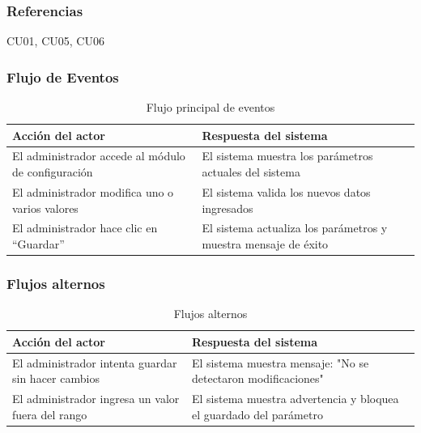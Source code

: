\subsubsection*{Referencias}
CU01, CU05, CU06

\subsubsection*{Flujo de Eventos}
\begin{table}[h]
	\centering
	\caption{Flujo principal de eventos}
	\begin{tabular}{|p{7cm}|p{7cm}|}
		\hline
		\textbf{Acción del actor}                          & \textbf{Respuesta del sistema}                                 \\ \hline
		El administrador accede al módulo de configuración & El sistema muestra los parámetros actuales del sistema         \\ \hline
		El administrador modifica uno o varios valores     & El sistema valida los nuevos datos ingresados                  \\ \hline
		El administrador hace clic en “Guardar”            & El sistema actualiza los parámetros y muestra mensaje de éxito \\ \hline
	\end{tabular}
\end{table}

\subsubsection*{Flujos alternos}
\begin{table}[h]
	\centering
	\caption{Flujos alternos}
	\begin{tabular}{|p{7cm}|p{7cm}|}
		\hline
		\textbf{Acción del actor}                          & \textbf{Respuesta del sistema}                                     \\ \hline
		El administrador intenta guardar sin hacer cambios & El sistema muestra mensaje: "No se detectaron modificaciones"      \\ \hline
		El administrador ingresa un valor fuera del rango  & El sistema muestra advertencia y bloquea el guardado del parámetro \\ \hline
	\end{tabular}
\end{table}

